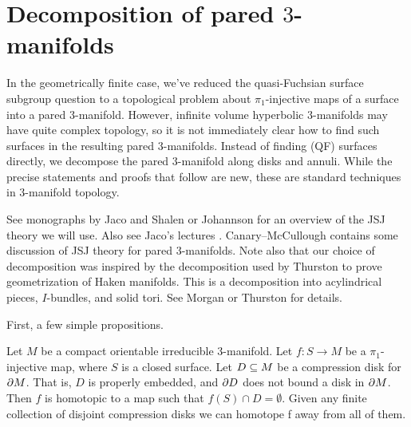 \section{Decomposition of pared \texorpdfstring{$3$}{3}-manifolds}

In the geometrically finite case, we've reduced the quasi-Fuchsian surface
subgroup question to a topological problem about $\pi_1$-injective maps of
a surface into a pared $3$-manifold. However, infinite volume hyperbolic
$3$-manifolds may have quite complex topology, so it is not immediately clear
how to find such surfaces in the resulting pared $3$-manifolds. Instead of
finding (QF) surfaces directly, we decompose the pared $3$-manifold along disks
and annuli.  While the precise statements and proofs that follow are new, these
are standard techniques in $3$-manifold topology.

See monographs by Jaco and Shalen \cite{JacoShalen} or Johannson
\cite{Johannson} for an overview of the JSJ theory we will use. Also see Jaco's
lectures \cite{Ja}. Canary--McCullough \cite{CMc} contains some discussion of
JSJ theory for pared $3$-manifolds.  Note also that our choice of decomposition
was inspired by the decomposition used by Thurston to prove geometrization of
Haken manifolds.  This is a decomposition into acylindrical pieces,
$I$-bundles, and solid tori.  See Morgan \cite{Mo} or Thurston
\cite{ThurstonIII} for details.

First, a few simple propositions.

\begin{prop}\label{P:avoiddisk}

Let $M$ be a compact orientable irreducible $3$-manifold. Let $f \colon S \to
M$ be a $\pi_1$-injective map, where $S$ is a closed surface.  Let $D \subseteq M$
be a compression disk for $\partial M$. That is, $D$ is properly embedded, and $\partial
D$ does not bound a disk in $\partial M$. Then $f$ is homotopic to a map such that
$f(S) \cap D = \emptyset$. Given any finite collection of disjoint compression
disks we can homotope f away from all of them.

\end{prop}


